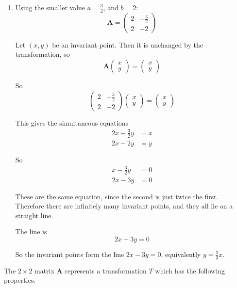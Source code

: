 \documentclass[leqno]{article}
\begin{document}
\begin{enumerate}[
  label=\textbf{\arabic*.},
  leftmargin=*,
  topsep=0pt,
  partopsep=0pt,
  parsep=0pt
]
\begin{djsSolution}
\begin{enumerate}[label=\textbf{(\alph*)}]
Hence
\[
b=2,\qquad a=\frac32 \text{ or } 2
\]

  \item Using the smaller value \(a=\frac32\), and \(b=2\):
\[
\mathbf{A}=\begin{pmatrix} 2 & -\frac32 \\ 2 & -2 \end{pmatrix}
\]

Let \((x,y)\) be an invariant point. Then it is unchanged by the transformation, so
\[
\mathbf{A}\begin{pmatrix}x\\y\end{pmatrix}=\begin{pmatrix}x\\y\end{pmatrix}
\]

So
\[
\begin{pmatrix} 2 & -\frac32 \\ 2 & -2 \end{pmatrix}
\begin{pmatrix} x \\ y \end{pmatrix}
=
\begin{pmatrix} x \\ y \end{pmatrix}
\]

This gives the simultaneous equations
\begin{align*}
2x-\frac32 y&=x\\
2x-2y&=y
\end{align*}

So
\begin{align*}
x-\frac32 y&=0\\
2x-3y&=0
\end{align*}

These are the same equation, since the second is just twice the first. Therefore there are infinitely many invariant points, and they all lie on a straight line.

The line is
\[
2x-3y=0
\]

So the invariant points form the line \(2x-3y=0\), equivalently \(y=\frac{2}{3}x\).
\end{enumerate}
\end{djsSolution}


\newpage

\questionitem

The $2 \times 2$ matrix $\mathbf{A}$ represents a transformation $T$ which has the following properties. \\


\end{enumerate}
\end{document}
